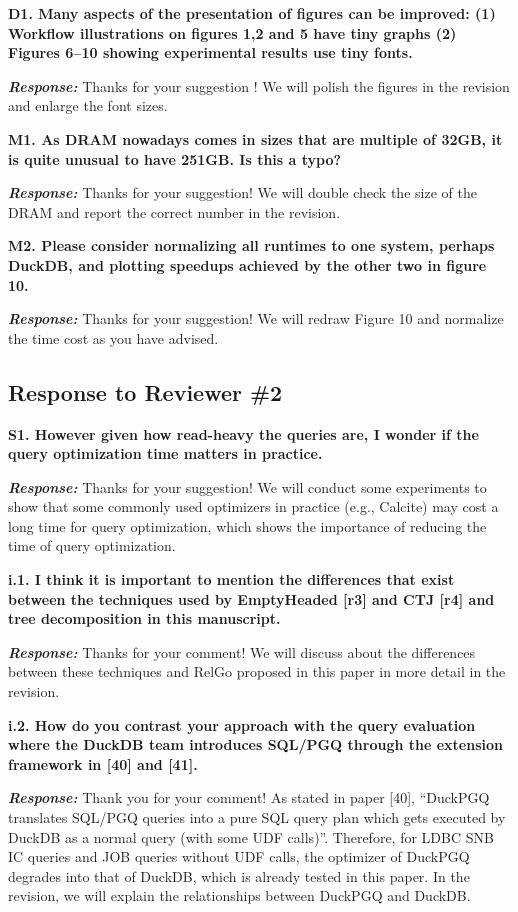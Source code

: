 \textbf{D1. Many aspects of the presentation of figures can be improved: 
(1) Workflow illustrations on figures 1,2 and 5 have tiny graphs
(2) Figures 6--10 showing experimental results use tiny fonts.}

\textbf{\textit{Response: }}
Thanks for your suggestion ! We will polish the figures in the revision and enlarge the font sizes.


\textbf{M1. As DRAM nowadays comes in sizes that are multiple of 32GB, it is quite unusual to have 251GB. Is this a typo?}

\textbf{\textit{Response: }}
Thanks for your suggestion! We will double check the size of the DRAM and report the correct number in the revision.

\textbf{M2. Please consider normalizing all runtimes to one system, perhaps DuckDB, and plotting speedups achieved by the other two in figure 10.}

\textbf{\textit{Response: }}
Thanks for your suggestion! We will redraw Figure 10 and normalize the time cost as you have advised.


\subsection{Response to Reviewer \#2}

\textbf{S1. However given how read-heavy the queries are, I wonder if the query optimization time matters in practice.}

\textbf{\textit{Response: }}
Thanks for your suggestion! We will conduct some experiments to show that some commonly used optimizers in practice (e.g., Calcite) may cost a long time for query optimization, which shows the importance of reducing the time of query optimization. 



\textbf{
i.1. I think it is important to mention the differences that exist between the techniques used by EmptyHeaded [r3] and CTJ [r4]  and tree decomposition in this manuscript.}

\textbf{\textit{Response: }}
Thanks for your comment! We will discuss about the differences between these techniques and RelGo proposed in this paper in more detail in the revision.


\textbf{i.2. How do you contrast your approach with the query evaluation where the DuckDB team introduces SQL/PGQ through the extension framework in [40] and [41].}

\textbf{\textit{Response: }}
Thank you for your comment! As stated in paper [40], ``DuckPGQ translates SQL/PGQ queries into a pure SQL query plan which gets executed by DuckDB as a normal query (with some UDF calls)''. Therefore, for LDBC SNB IC queries and JOB queries without UDF calls, the optimizer of DuckPGQ degrades into that of DuckDB, which is already tested in this paper. In the revision, we will explain the relationships between DuckPGQ and DuckDB.

